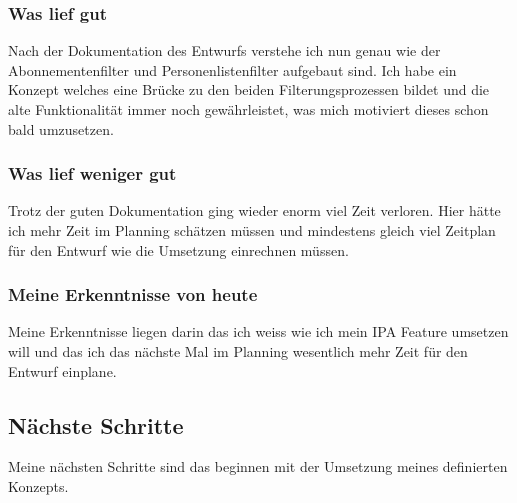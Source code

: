\subsubsection*{Was lief gut}
Nach der Dokumentation des Entwurfs verstehe ich nun genau wie der Abonnementenfilter und Personenlistenfilter aufgebaut sind. 
Ich habe ein Konzept welches eine Brücke zu den beiden Filterungsprozessen bildet und die alte Funktionalität immer noch gewährleistet,
was mich motiviert dieses schon bald umzusetzen.

\subsubsection*{Was lief weniger gut}
Trotz der guten Dokumentation ging wieder enorm viel Zeit verloren. Hier hätte ich mehr Zeit im Planning schätzen müssen und mindestens gleich viel Zeitplan
für den Entwurf wie die Umsetzung einrechnen müssen.

\subsubsection*{Meine Erkenntnisse von heute}
Meine Erkenntnisse liegen darin das ich weiss wie ich mein IPA Feature umsetzen will und das ich das nächste Mal im Planning wesentlich
mehr Zeit für den Entwurf einplane.

\subsection*{Nächste Schritte}
Meine nächsten Schritte sind das beginnen mit der Umsetzung meines definierten Konzepts.

\pagebreak
